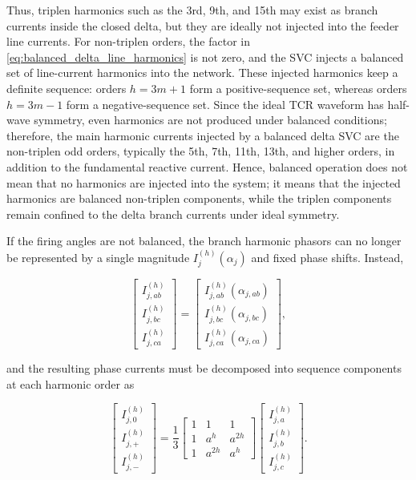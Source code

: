 \documentclass[journal]{IEEEtran}
\begin{document}
\noindent Thus, triplen harmonics such as the 3rd, 9th, and 15th may exist as
branch currents inside the closed delta, but they are ideally not injected
into the feeder line currents. For non-triplen orders, the factor in
\eqref{eq:balanced_delta_line_harmonics} is not zero, and the SVC injects a
balanced set of line-current harmonics into the network. These injected
harmonics keep a definite sequence: orders $h=3m+1$ form a positive-sequence
set, whereas orders $h=3m-1$ form a negative-sequence set. Since the ideal TCR
waveform has half-wave symmetry, even harmonics are not produced under
balanced conditions; therefore, the main harmonic currents injected by a
balanced delta SVC are the non-triplen odd orders, typically the 5th, 7th,
11th, 13th, and higher orders, in addition to the fundamental reactive
current. Hence, balanced operation does not mean that no harmonics are
injected into the system; it means that the injected harmonics are balanced
non-triplen components, while the triplen components remain confined to the
delta branch currents under ideal symmetry.

If the firing angles are not balanced, the branch harmonic phasors can no
longer be represented by a single magnitude $I_j^{(h)}(\alpha_j)$ and fixed
phase shifts. Instead,

\begin{equation}
    \begin{bmatrix}
    I_{j,ab}^{(h)} \\
    I_{j,bc}^{(h)} \\
    I_{j,ca}^{(h)}
    \end{bmatrix}
    =
    \begin{bmatrix}
    I_{j,ab}^{(h)}(\alpha_{j,ab}) \\
    I_{j,bc}^{(h)}(\alpha_{j,bc}) \\
    I_{j,ca}^{(h)}(\alpha_{j,ca})
    \end{bmatrix},
    \label{eq:unbalanced_branch_harmonics}
\end{equation}

\noindent and the resulting phase currents must be decomposed into sequence
components at each harmonic order as

\begin{equation}
    \begin{bmatrix}
    I_{j,0}^{(h)} \\
    I_{j,+}^{(h)} \\
    I_{j,-}^{(h)}
    \end{bmatrix}
    =\frac{1}{3}
    \begin{bmatrix}
    1 & 1 & 1 \\
    1 & a^{h} & a^{2h} \\
    1 & a^{2h} & a^{h}
    \end{bmatrix}
    \begin{bmatrix}
    I_{j,a}^{(h)} \\
    I_{j,b}^{(h)} \\
    I_{j,c}^{(h)}
    \end{bmatrix}.
    \label{eq:harmonic_sequence_decomposition}
\end{equation}
\end{document}

